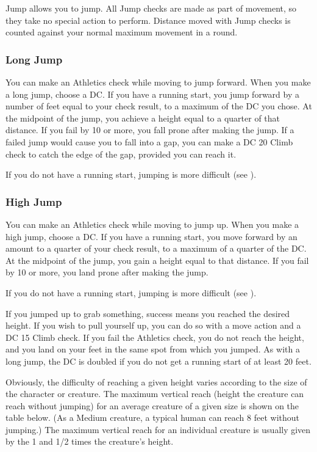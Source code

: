 Jump allows you to jump. All Jump checks are made as part of movement, so they take no special action to perform. Distance moved with Jump checks is counted against your normal maximum movement in a round.

\subsubsection{Long Jump}
You can make an Athletics check while moving to jump forward. When you make a long jump, choose a DC. If you have a running start, you jump forward by a number of feet equal to your check result, to a maximum of the DC you chose. At the midpoint of the jump, you achieve a height equal to a quarter of that distance. If you fail by 10 or more, you fall prone after making the jump. If a failed jump would cause you to fall into a gap, you can make a DC 20 Climb check to catch the edge of the gap, provided you can reach it.

If you do not have a running start, jumping is more difficult (see ).

\subsubsection{High Jump}
You can make an Athletics check while moving to jump up. When you make a high jump, choose a DC. If you have a running start, you move forward by an amount to a quarter of your check result, to a maximum of a quarter of the DC. At the midpoint of the jump, you gain a height equal to that distance. If you fail by 10 or more, you land prone after making the jump.

If you do not have a running start, jumping is more difficult (see ).

If you jumped up to grab something, success means you reached the desired height. If you wish to pull yourself up, you can do so with a move action and a DC 15 Climb check. If you fail the Athletics check, you do not reach the height, and you land on your feet in the same spot from which you jumped. As with a long jump, the DC is doubled if you do not get a running start of at least 20 feet.

Obviously, the difficulty of reaching a given height varies according to the size of the character or creature. The maximum vertical reach (height the creature can reach without jumping) for an average creature of a given size is shown on the table below. (As a Medium creature, a typical human can reach 8 feet without jumping.) The maximum vertical reach for an individual creature is usually given by the 1 and 1/2 times the creature's height.

